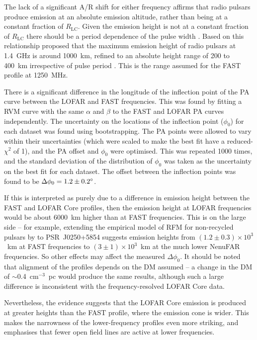 The lack of a significant A/R shift for either frequency affirms that radio pulsars produce emission at an absolute emission altitude, rather than being at a constant fraction of $R_\mathrm{LC}$. Given the emission height is not at a constant fraction of $R_\mathrm{LC}$ there should be a period dependence of the pulse width \citep[e.g.][]{Rxxx1993}. Based on this relationship \citet{KJxx2007} proposed that the maximum emission height of radio pulsars at 1.4~GHz is around 1000~km, refined to an absolute height range of 200 to 400~km irrespective of pulse period \citep{JKxx2019, JSKx2020}. This is the range assumed for the FAST profile at 1250~MHz.

There is a significant difference in the longitude of the inflection point of the PA curve between the LOFAR and FAST frequencies. This was found by fitting a RVM curve with the same $\alpha$ and $\beta$ to the FAST and LOFAR PA curves independently. The uncertainty on the locations of the inflection point ($\phi_0$) for each dataset was found using bootstrapping. The PA points were allowed to vary within their uncertainties (which were scaled to make the best fit have a reduced-$\chi^2$ of 1), and the PA offset and $\phi_0$ were optimised. This was repeated 1000 times, and the standard deviation of the distribution of $\phi_0$ was taken as the uncertainty on the best fit for each dataset. The offset between the inflection points was found to be $\Delta \phi_0 = 1.2\pm 0.2^\circ$.

If this is interpreted as purely due to a difference in emission height between the FAST and LOFAR Core profiles, then the emission height at LOFAR frequencies would be about 6000~km higher than at FAST frequencies. This is on the large side -- for example, extending the empirical model of RFM for non-recycled pulsars by \citet{KGxx2003} to PSR~J0250+5854 suggests emission heights from $(1.2\pm0.3)\times 10^3$~km at FAST frequencies to $(3\pm1)\times10^3$~km at the much lower NenuFAR frequencies. So other effects may affect the measured $\Delta\phi_0$. It should be noted that alignment of the profiles depends on the DM assumed -- a change in the DM of $\sim$0.4~cm$^{-3}$~pc would produce the same results, although such a large difference is inconsistent with the frequency-resolved LOFAR Core data. 

Nevertheless, the evidence suggests that the LOFAR Core emission is produced at greater heights than the FAST profile, where the emission cone is wider. This makes the narrowness of the lower-frequency profiles even more striking, and emphasises that fewer open field lines are active at lower frequencies.















